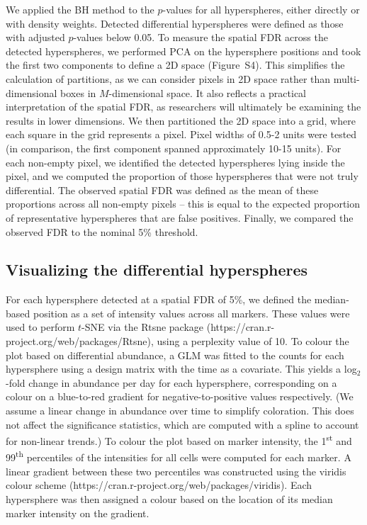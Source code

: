 \documentclass{article}
\newcommand{\suppfigfdr}{S4}
\begin{document}
We applied the BH method to the $p$-values for all hyperspheres, either directly or with density weights.
Detected differential hyperspheres were defined as those with adjusted $p$-values below 0.05.
To measure the spatial FDR across the detected hyperspheres, we performed PCA on the hypersphere positions and took the first two components to define a 2D space (Figure~\suppfigfdr{}).
This simplifies the calculation of partitions, as we can consider pixels in 2D space rather than multi-dimensional boxes in $M$-dimensional space.
It also reflects a practical interpretation of the spatial FDR, as researchers will ultimately be examining the results in lower dimensions.
We then partitioned the 2D space into a grid, where each square in the grid represents a pixel.
Pixel widths of 0.5-2 units were tested (in comparison, the first component spanned approximately 10-15 units).
For each non-empty pixel, we identified the detected hyperspheres lying inside the pixel, and we computed the proportion of those hyperspheres that were not truly differential.
The observed spatial FDR was defined as the mean of these proportions across all non-empty pixels --
this is equal to the expected proportion of representative hyperspheres that are false positives.
Finally, we compared the observed FDR to the nominal 5\% threshold.

\subsection{Visualizing the differential hyperspheres}
For each hypersphere detected at a spatial FDR of 5\%, we defined the median-based position as a set of intensity values across all markers.
These values were used to perform $t$-SNE via the Rtsne package (https://cran.r-project.org/web/packages/Rtsne), using a perplexity value of 10.
To colour the plot based on differential abundance, a GLM was fitted to the counts for each hypersphere using a design matrix with the time as a covariate.
This yields a log$_2$-fold change in abundance per day for each hypersphere, corresponding on a colour on a blue-to-red gradient for negative-to-positive values respectively.
(We assume a linear change in abundance over time to simplify coloration.
This does not affect the significance statistics, which are computed with a spline to account for non-linear trends.)
To colour the plot based on marker intensity, the 1\textsuperscript{st} and 99\textsuperscript{th} percentiles of the intensities for all cells were computed for each marker.
A linear gradient between these two percentiles was constructed using the viridis colour scheme (https://cran.r-project.org/web/packages/viridis).
Each hypersphere was then assigned a colour based on the location of its median marker intensity on the gradient. 
\end{document}
